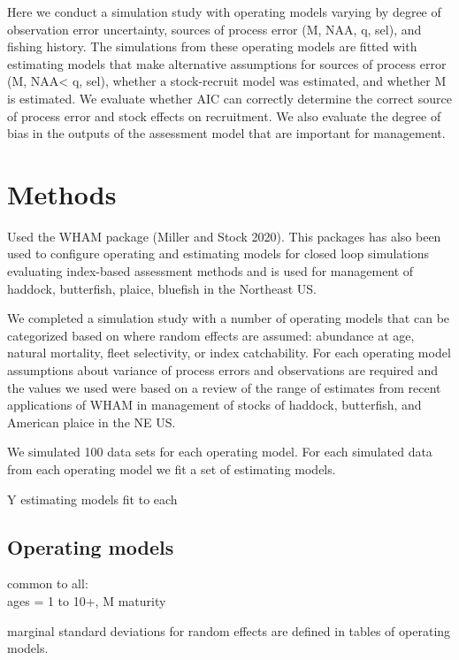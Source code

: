 \documentclass[
  12pt,
]{article}
\begin{document}
Here we conduct a simulation study with operating models varying by
degree of observation error uncertainty, sources of process error (M,
NAA, q, sel), and fishing history. The simulations from these operating
models are fitted with estimating models that make alternative
assumptions for sources of process error (M, NAA\textless{} q, sel),
whether a stock-recruit model was estimated, and whether M is estimated.
We evaluate whether AIC can correctly determine the correct source of
process error and stock effects on recruitment. We also evaluate the
degree of bias in the outputs of the assessment model that are important
for management.

\hypertarget{methods}{%
\section{Methods}\label{methods}}

Used the WHAM package \citep[][commit 77bbd94]{stockmiller21} (Miller
and Stock 2020). This packages has also been used to configure operating
and estimating models for closed loop simulations evaluating index-based
assessment methods \citep{legaultetalinpress} and is used for management
of haddock, butterfish, plaice, bluefish in the Northeast US.

We completed a simulation study with a number of operating models that
can be categorized based on where random effects are assumed: abundance
at age, natural mortality, fleet selectivity, or index catchability. For
each operating model assumptions about variance of process errors and
observations are required and the values we used were based on a review
of the range of estimates from recent applications of WHAM in management
of stocks of haddock, butterfish, and American plaice in the NE US.

We simulated 100 data sets for each operating model. For each simulated
data from each operating model we fit a set of estimating models.

Y estimating models fit to each

\hypertarget{operating-models}{%
\subsection{Operating models}\label{operating-models}}

common to all:\\
ages = 1 to 10+, M maturity

marginal standard deviations for random effects are defined in tables of
operating models.
\end{document}
